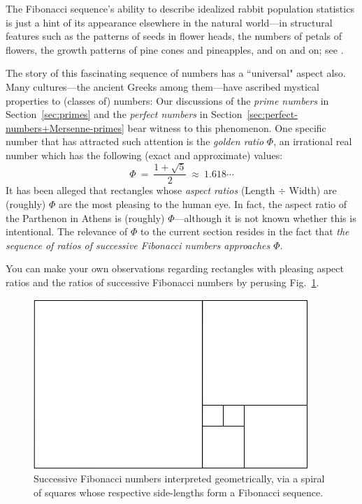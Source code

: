 \smallskip

The Fibonacci sequence's ability to describe idealized rabbit population statistics is just a hint of its appearance elsewhere in the natural world---in structural features such as the patterns of seeds in flower heads, the numbers of petals of flowers, the growth patterns of pine cones and pineapples, and on and on; see \cite{Basin63}.

\medskip

 
The story of this fascinating sequence of numbers has a ``universal" aspect also.  Many cultures---the ancient Greeks among them---have ascribed mystical properties to (classes of) numbers:  Our discussions of the {\it prime numbers} in Section~\ref{sec:primes} and the {\it perfect numbers} in Section~\ref{sec:perfect-numbers+Mersenne-primes} bear witness to this
phenomenon.  One specific number that has attracted such attention is the {\it golden ratio} $\Phi$, an irrational real number which has the following (exact and approximate) values: 
\[ \Phi \ = \ \frac{1+\sqrt{5}}{2} \ \approx \  1.618\cdots \]
It has been alleged that rectangles whose {\it aspect ratios} (Length $\div$ Width) are (roughly) $\Phi$ are the most pleasing to the human eye.  In fact, the aspect ratio of the Parthenon in Athens is (roughly) $\Phi$---although it is not known whether this is intentional.  The relevance of $\Phi$ to the current section resides in the fact that {\em the sequence of ratios of successive Fibonacci numbers approaches $\Phi$}.

\smallskip

You can make your own observations regarding rectangles with pleasing aspect ratios and the ratios of successive Fibonacci numbers by perusing Fig.~\ref{fig:fibosquare}.
\begin{figure}[htb]
\begin{center}
        \includegraphics[scale=0.35]{FiguresMaths//Fiboembedded}
\caption{Successive Fibonacci numbers interpreted geometrically, via a spiral of squares whose respective side-lengths form a Fibonacci sequence.}
        \label{fig:fibosquare}
\end{center}
\end{figure}

